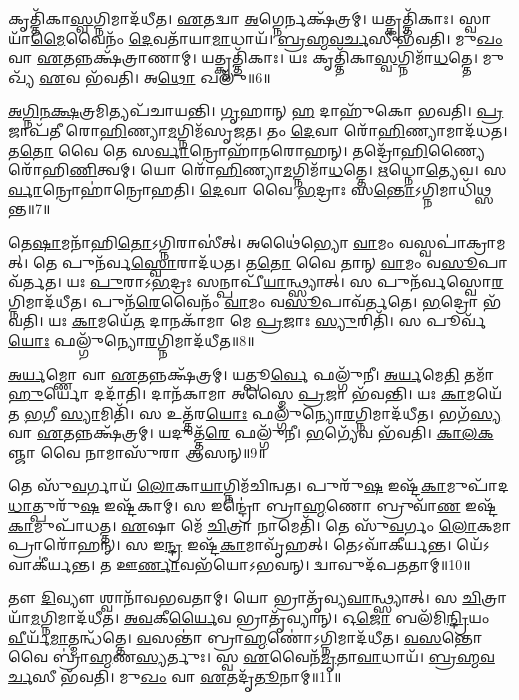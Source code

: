 𑌕𑍃𑌤𑍍𑌤𑌿᳴𑌕𑌾\-\ul{𑌸𑍍𑌵}\-𑌗𑍍𑌨𑌿𑌮𑌾𑌦᳴𑌧𑍀𑌤।
\-\ul{𑌏}\-𑌤𑌦𑍍𑌵𑌾 \ul{𑌅}\-𑌗𑍍𑌨𑍇𑌰𑍍𑌨𑌕𑍍𑌷᳴𑌤𑍍𑌰𑌮𑍍।
𑌯𑌤𑍍𑌕𑍃𑌤𑍍𑌤𑌿᳴𑌕𑌾𑌃।
𑌸𑍍𑌵𑌾𑌯𑌾᳴\-\ul{𑌮𑍈}\-𑌵𑍈𑌨𑌂᳴ \ul{𑌦𑍇}\-𑌵𑌤𑌾᳴𑌯𑌾\-\ul{𑌮𑌾}\-𑌧𑌾𑌯᳴।
\-\ul{𑌬𑍍𑌰}\-\-\ul{𑌹𑍍𑌮}\-\-\ul{𑌵}\-\-\ul{𑌰𑍍𑌚}\-𑌸𑍀 𑌭᳴𑌵𑌤𑌿।
𑌮𑍁\-\ul{𑌖𑌂} 𑌵𑌾 \ul{𑌏}\-𑌤𑌨𑍍𑌨𑌕𑍍𑌷᳴𑌤𑍍𑌰𑌾𑌣𑌾𑌮𑍍।
𑌯𑌤𑍍𑌕𑍃𑌤𑍍𑌤𑌿᳴𑌕𑌾𑌃।
𑌯𑌃 𑌕𑍃𑌤𑍍𑌤𑌿᳴𑌕𑌾\-\ul{𑌸𑍍𑌵}\-𑌗𑍍𑌨𑌿𑌮𑌾᳴\-\ul{𑌧}\-𑌤𑍍𑌤𑍇।
𑌮𑍁𑌖𑍍𑌯᳴ \ul{𑌏}\-𑌵 𑌭᳴𑌵𑌤𑌿।
𑌅\-\ul{𑌥𑍋} 𑌖𑌲𑍁᳴॥6॥

\-\ul{𑌅}\-\-\ul{𑌗𑍍𑌨𑌿}\-\-\ul{𑌨}\-\-\ul{𑌕𑍍𑌷}\-𑌤𑍍𑌰𑌮𑌿𑌤𑍍𑌯𑌪᳴𑌚𑌾𑌯𑌨𑍍𑌤𑌿।
\-\ul{𑌗𑍃}\-𑌹𑌾𑌨𑍍 \ul{𑌹} 𑌦𑌾𑌹𑍁᳴𑌕𑍋 𑌭𑌵𑌤𑌿।
\-\ul{𑌪𑍍𑌰}\-𑌜𑌾𑌪᳴𑌤𑍀 𑌰𑍋\-\ul{𑌹𑌿}\-𑌣𑍍𑌯𑌾\-\ul{𑌮}\-𑌗𑍍𑌨𑌿𑌮᳴\-𑌸𑍃𑌜𑌤।
𑌤𑌂 \ul{𑌦𑍇}\-𑌵𑌾 𑌰𑍋᳴\-\ul{𑌹𑌿}\-𑌣𑍍𑌯𑌾𑌮𑌾𑌦᳴𑌧𑌤।
𑌤\-\ul{𑌤𑍋} 𑌵𑍈 𑌤𑍇 𑌸\-\ul{𑌰𑍍𑌵𑌾}\-𑌨𑍍𑌰𑍋𑌹𑌾᳴𑌨𑌰𑍋𑌹𑌨𑍍।
𑌤𑌦𑍍𑌰𑍋᳴\-\ul{𑌹𑌿}\-𑌣𑍍𑌯𑍈 𑌰𑍋᳴𑌹𑌿\-\ul{𑌣𑌿}\-𑌤𑍍𑌵𑌮𑍍।
𑌯𑍋 𑌰𑍋᳴\-\ul{𑌹𑌿}\-𑌣𑍍𑌯𑌾\-\ul{𑌮}\-𑌗𑍍𑌨𑌿𑌮𑌾᳴\-\ul{𑌧}\-𑌤𑍍𑌤𑍇।
\-\ul{𑌋}\-𑌧𑍍𑌨𑍋\-\ul{𑌤𑍍𑌯𑍇}\-𑌵।
𑌸\-\ul{𑌰𑍍𑌵𑌾}\-𑌨𑍍𑌰𑍋𑌹𑌾॑𑌨𑍍𑌰𑍋𑌹𑌤𑌿।
\-\ul{𑌦𑍇}\-𑌵𑌾 𑌵𑍈 \ul{𑌭}\-𑌦𑍍𑌰𑌾𑌃 𑌸\-\ul{𑌨𑍍𑌤𑍋}\-\-𑌽𑌗𑍍𑌨𑌿𑌮𑌾𑌧𑌿᳴𑌥𑍍𑌸𑌨𑍍𑌤॥7॥

𑌤𑍇\-\ul{𑌷𑌾}\-𑌮𑌨𑌾᳴𑌹𑌿\-\ul{𑌤𑍋}\-\-𑌽𑌗𑍍𑌨𑌿𑌰𑌾𑌸𑍀॑𑌤𑍍।
𑌅𑌥𑍈॑𑌭𑍍𑌯𑍋 \ul{𑌵𑌾}\-𑌮𑌂 𑌵𑌸𑍍𑌵𑌪𑌾॑𑌕𑍍𑌰𑌾𑌮𑌤𑍍।
𑌤𑍇 𑌪𑍁𑌨᳴𑌰𑍍𑌵\-\ul{𑌸𑍍𑌵𑍋}\-𑌰𑌾𑌦᳴𑌧𑌤।
𑌤\-\ul{𑌤𑍋} 𑌵𑍈 𑌤𑌾𑌨𑍍 \ul{𑌵𑌾}\-𑌮𑌂 𑌵\-\ul{𑌸𑍂}\-𑌪𑌾𑌵᳴𑌰𑍍𑌤𑌤।
𑌯𑌃 \ul{𑌪𑍁}\-𑌰𑌾𑌽\-\ul{𑌭}\-𑌦𑍍𑌰𑌃 𑌸𑌨𑍍𑌪𑌾𑌪𑍀᳴\-\ul{𑌯𑌾}\-𑌨𑍍𑌥𑍍𑌸𑍍𑌯𑌾𑌤𑍍।
𑌸 𑌪𑍁𑌨᳴𑌰𑍍𑌵𑌸𑍍𑌵𑍋\-\ul{𑌰}\-𑌗𑍍𑌨𑌿𑌮𑌾𑌦᳴𑌧𑍀𑌤।
𑌪𑍁𑌨᳴\-\ul{𑌰𑍇}\-𑌵𑍈𑌨𑌂᳴ \ul{𑌵𑌾}\-𑌮𑌂 𑌵\-\ul{𑌸𑍂}\-𑌪𑌾𑌵᳴𑌰𑍍𑌤𑌤𑍇।
\-\ul{𑌭}\-𑌦𑍍𑌰𑍋 𑌭᳴𑌵𑌤𑌿।
𑌯𑌃 \ul{𑌕𑌾}\-𑌮𑌯𑍇᳴\-\ul{𑌤} 𑌦𑌾𑌨𑌕𑌾᳴𑌮𑌾 𑌮𑍇 \ul{𑌪𑍍𑌰}\-𑌜𑌾𑌃 \ul{𑌸𑍍𑌯𑍁}\-𑌰𑌿𑌤𑌿᳴।
𑌸 𑌪𑍂𑌰𑍍𑌵᳴\-\ul{𑌯𑍋𑌃} 𑌫𑌲𑍍𑌗𑍁᳴𑌨𑍍𑌯𑍋\-\ul{𑌰}\-𑌗𑍍𑌨𑌿𑌮𑌾𑌦᳴𑌧𑍀𑌤॥8॥

\-\ul{𑌅}\-\-\ul{𑌰𑍍𑌯}\-𑌮𑍍𑌣𑍋 𑌵𑌾 \ul{𑌏}\-𑌤𑌨𑍍𑌨𑌕𑍍𑌷᳴𑌤𑍍𑌰𑌮𑍍।
𑌯𑌤𑍍𑌪𑍂\-\ul{𑌰𑍍𑌵𑍇} 𑌫𑌲𑍍𑌗𑍁᳴𑌨𑍀।
\-\ul{𑌅}\-\-\ul{𑌰𑍍𑌯}\-𑌮𑍇\-\ul{𑌤𑌿} 𑌤𑌮𑌾᳴\-\ul{𑌹𑍁}\-𑌰𑍍𑌯𑍋 𑌦𑌦𑌾᳴𑌤𑌿।
𑌦𑌾𑌨᳴𑌕𑌾𑌮𑌾 𑌅𑌸𑍍𑌮𑍈 \ul{𑌪𑍍𑌰}\-𑌜𑌾 𑌭᳴𑌵𑌨𑍍𑌤𑌿।
𑌯𑌃 \ul{𑌕𑌾}\-𑌮𑌯𑍇᳴𑌤 \ul{𑌭}\-𑌗𑍀 \ul{𑌸𑍍𑌯𑌾}\-𑌮𑌿𑌤𑌿᳴।
𑌸 𑌉𑌤𑍍𑌤᳴𑌰\-\ul{𑌯𑍋𑌃} 𑌫𑌲𑍍𑌗𑍁᳴𑌨𑍍𑌯𑍋\-\ul{𑌰}\-𑌗𑍍𑌨𑌿𑌮𑌾𑌦᳴𑌧𑍀𑌤।
𑌭𑌗᳴\-\ul{𑌸𑍍𑌯} 𑌵𑌾 \ul{𑌏}\-𑌤𑌨𑍍𑌨𑌕𑍍𑌷᳴𑌤𑍍𑌰𑌮𑍍।
𑌯𑌦𑍁𑌤𑍍𑌤᳴\-\ul{𑌰𑍇} 𑌫𑌲𑍍𑌗𑍁᳴𑌨𑍀।
\-\ul{𑌭}\-𑌗𑍍𑌯𑍇᳴𑌵 𑌭᳴𑌵𑌤𑌿।
\-\ul{𑌕𑌾}\-\-\ul{𑌲}\-\-\ul{𑌕}\-𑌞𑍍𑌜𑌾 𑌵𑍈 𑌨𑌾𑌮𑌾𑌸𑍁᳴𑌰𑌾 𑌆𑌸𑌨𑍍॥9॥

𑌤𑍇 𑌸𑍁᳴\-\ul{𑌵}\-𑌰𑍍𑌗𑌾𑌯᳴ \ul{𑌲𑍋}\-𑌕𑌾\-\ul{𑌯𑌾}\-𑌗𑍍𑌨𑌿𑌮᳴𑌚𑌿𑌨𑍍𑌵𑌤।
𑌪𑍁𑌰𑍁᳴\-\ul{𑌷} 𑌇𑌷𑍍𑌟᳴\-\ul{𑌕𑌾}\-𑌮𑍁𑌪𑌾᳴𑌦\-\ul{𑌧𑌾}\-𑌤𑍍\-𑌪𑍁𑌰𑍁᳴\-\ul{𑌷} 𑌇𑌷𑍍𑌟᳴𑌕𑌾𑌮𑍍।
𑌸 𑌇𑌨𑍍𑌦𑍍𑌰𑍋॑ 𑌬𑍍𑌰𑌾\-\ul{𑌹𑍍𑌮}\-𑌣𑍋 𑌬𑍍𑌰𑍁𑌵𑌾᳴\-\ul{𑌣} 𑌇𑌷𑍍𑌟᳴\-\ul{𑌕𑌾}\-𑌮𑍁𑌪𑌾᳴𑌧𑌤𑍍𑌤।
\-\ul{𑌏}\-𑌷𑌾 𑌮𑍇᳴ \ul{𑌚𑌿}\-𑌤𑍍𑌰𑌾 𑌨𑌾𑌮𑍇𑌤𑌿᳴।
𑌤𑍇 𑌸𑍁᳴\-\ul{𑌵}\-𑌰𑍍𑌗𑌂 \ul{𑌲𑍋}\-𑌕𑌮𑌾 𑌪𑍍𑌰𑌾𑌰𑍋᳴𑌹𑌨𑍍।
𑌸 𑌇\-\ul{𑌨𑍍𑌦𑍍𑌰} 𑌇𑌷𑍍𑌟᳴\-\ul{𑌕𑌾}\-𑌮𑌾𑌵𑍃᳴𑌹𑌤𑍍।
𑌤𑍇𑌽𑌵𑌾᳴𑌕𑍀𑌰𑍍𑌯𑌨𑍍𑌤।
𑌯𑍇᳴𑌽𑌵𑌾𑌕𑍀॑𑌰𑍍𑌯𑌨𑍍𑌤।
𑌤 𑌊\-\ul{𑌰𑍍𑌣𑌾}\-𑌵𑌭᳴𑌯𑍋\-𑌽𑌭𑌵𑌨𑍍।
𑌦𑍍𑌵𑌾𑌵𑍁𑌦᳴𑌪𑌤𑌤𑌾𑌮𑍍॥10॥

𑌤𑍗 \ul{𑌦𑌿}\-𑌵𑍍𑌯𑍗 𑌶𑍍𑌵𑌾𑌨𑌾᳴𑌵𑌭𑌵𑌤𑌾𑌮𑍍।
𑌯𑍋 𑌭𑍍𑌰𑌾𑌤𑍃᳴𑌵𑍍𑌯\-\ul{𑌵𑌾}\-𑌨𑍍𑌥𑍍𑌸𑍍𑌯𑌾𑌤𑍍।
𑌸 \ul{𑌚𑌿}\-𑌤𑍍𑌰𑌾𑌯𑌾᳴\-\ul{𑌮}\-𑌗𑍍𑌨𑌿𑌮𑌾𑌦᳴𑌧𑍀𑌤।
\-\ul{𑌅}\-\-\ul{𑌵}\-𑌕𑍀\-\ul{𑌰𑍍𑌯𑍈}\-𑌵 𑌭𑍍𑌰𑌾𑌤𑍃᳴𑌵𑍍𑌯𑌾𑌨𑍍।
𑌓\-\ul{𑌜𑍋} 𑌬𑌲᳴𑌮𑌿\-\ul{𑌨𑍍𑌦𑍍𑌰𑌿}\-𑌯𑌂 \ul{𑌵𑍀}\-𑌰𑍍𑌯᳴\-\ul{𑌮𑌾}\-𑌤𑍍𑌮𑌨𑍍𑌧᳴𑌤𑍍𑌤𑍇।
\-\ul{𑌵}\-𑌸𑌨𑍍𑌤𑌾॑ 𑌬𑍍𑌰𑌾\-\ul{𑌹𑍍𑌮}\-𑌣𑍋॑\-𑌽𑌗𑍍𑌨𑌿𑌮𑌾𑌦᳴𑌧𑍀𑌤।
\-\ul{𑌵}\-\-\ul{𑌸}\-𑌨𑍍𑌤𑍋 𑌵𑍈 𑌬𑍍𑌰𑌾॑\-\ul{𑌹𑍍𑌮}\-𑌣\-\ul{𑌸𑍍𑌯}\-𑌰𑍍𑌤𑍁𑌃।
𑌸𑍍𑌵 \ul{𑌏}\-𑌵𑍈𑌨᳴\-\ul{𑌮𑍃}\-𑌤𑌾\-\ul{𑌵𑌾}\-𑌧𑌾𑌯᳴।
\-\ul{𑌬𑍍𑌰}\-\-\ul{𑌹𑍍𑌮}\-\-\ul{𑌵}\-\-\ul{𑌰𑍍𑌚}\-𑌸𑍀 𑌭᳴𑌵𑌤𑌿।
𑌮𑍁\-\ul{𑌖𑌂} 𑌵𑌾 \ul{𑌏}\-𑌤𑌦𑍃᳴\-\ul{𑌤𑍂}\-𑌨𑌾𑌮𑍍॥11॥

